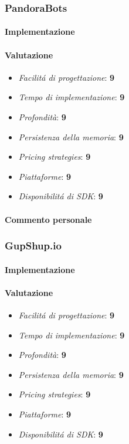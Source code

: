 \documentclass[]{article}
\begin{document}
\subsubsection{PandoraBots}
\paragraph{Implementazione}
\paragraph{Valutazione}
\begin{itemize}
\item \textit{Facilitá di progettazione}: \textbf{9} \\
\item \textit{Tempo di implementazione}: \textbf{9} \\
\item \textit{Profondità}: \textbf{9} \\
\item \textit{Persistenza della memoria}: \textbf{9} \\
\item \textit{Pricing strategies}: \textbf{9} \\
\item \textit{Piattaforme}: \textbf{9} \\
\item \textit{Disponibilitá di SDK}: \textbf{9} \\
\end{itemize}
\paragraph{Commento personale}

\subsubsection{GupShup.io}
\paragraph{Implementazione}
\paragraph{Valutazione}
\begin{itemize}
\item \textit{Facilitá di progettazione}: \textbf{9} \\
\item \textit{Tempo di implementazione}: \textbf{9} \\
\item \textit{Profondità}: \textbf{9} \\
\item \textit{Persistenza della memoria}: \textbf{9} \\
\item \textit{Pricing strategies}: \textbf{9} \\
\item \textit{Piattaforme}: \textbf{9} \\
\item \textit{Disponibilitá di SDK}: \textbf{9} \\
\end{itemize}
\end{document}
